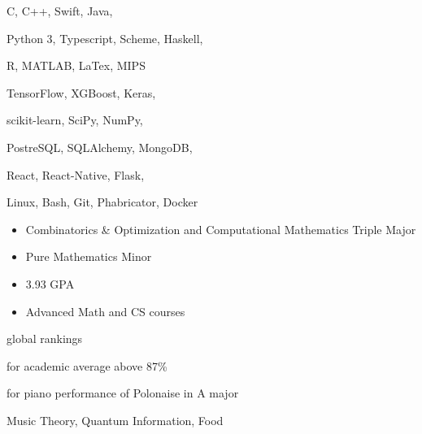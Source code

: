 C, C++, Swift, Java,
\smallskip

Python 3, Typescript, Scheme, Haskell,
\smallskip

R, MATLAB, LaTex, MIPS

\divider\smallskip

TensorFlow, XGBoost, Keras,
\smallskip

scikit-learn, SciPy, NumPy,
\smallskip

PostreSQL, SQLAlchemy, MongoDB,
\smallskip

React, React-Native, Flask,

\divider\smallskip

Linux, Bash, Git, Phabricator, Docker


\begin{itemize}
    \item Combinatorics \& Optimization and Computational Mathematics Triple Major
    \item Pure Mathematics Minor
    \item 3.93 GPA
    \item Advanced Math and CS courses
\end{itemize}


global rankings

\divider\smallskip

for academic average above 87\%

\divider\smallskip

for piano performance of Polonaise in A major

\divider\smallskip


Music Theory, Quantum Information, Food
